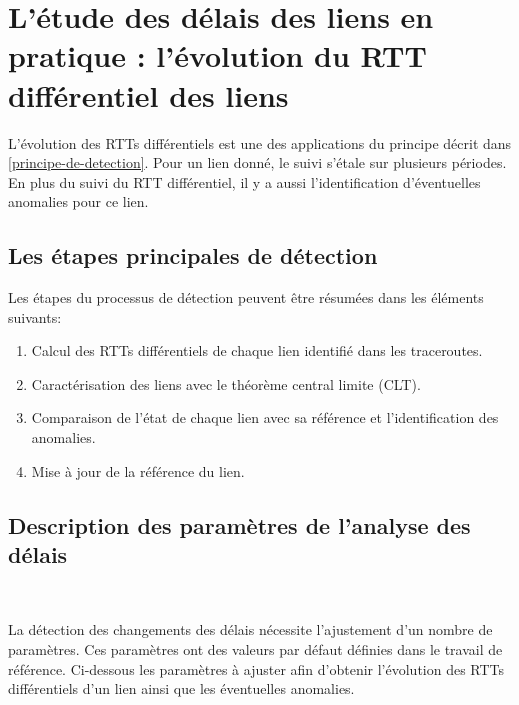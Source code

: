 \section{L'étude des délais des liens en pratique : l'évolution du RTT différentiel des liens}

L'évolution des RTTs différentiels est une des applications du principe décrit dans  \ref{principe-de-detection}. Pour un lien donné, le suivi s'étale sur plusieurs  périodes. En plus du suivi du RTT différentiel, il y a aussi l'identification d'éventuelles anomalies pour ce lien.


\subsection{Les étapes principales de détection} \label{steps:detection}
Les étapes du processus de détection peuvent être résumées dans les éléments suivants:

\begin{enumerate}
	\item Calcul des RTTs différentiels de chaque lien identifié dans les traceroutes.

	\item Caractérisation des liens avec le théorème central limite (CLT).
	
	\item  Comparaison de l'état de chaque lien avec sa référence  et l'identification des anomalies.

	\item Mise à jour de la référence du lien.
\end{enumerate}
\subsection{Description des paramètres de l'analyse des délais} \label{par:parametre-de-lanalyse}~

La détection des changements des délais nécessite l'ajustement d'un nombre de paramètres. Ces paramètres ont des valeurs par défaut définies dans le travail de référence. 
Ci-dessous les paramètres à ajuster afin d'obtenir l'évolution des RTTs différentiels d'un lien ainsi que les éventuelles anomalies.  

